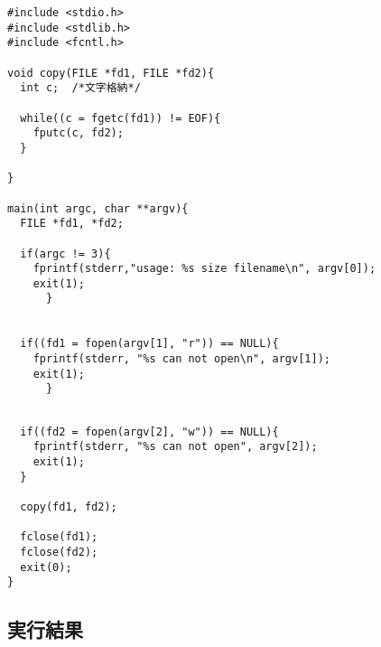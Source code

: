 \documentclass[12pt, a4paper, titlepage]{jsarticle}
\begin{document}
\begin{screen}
\begin{verbatim}
#include <stdio.h>
#include <stdlib.h>
#include <fcntl.h>

void copy(FILE *fd1, FILE *fd2){
  int c;  /*文字格納*/

  while((c = fgetc(fd1)) != EOF){
    fputc(c, fd2);
  }

}

main(int argc, char **argv){
  FILE *fd1, *fd2;

  if(argc != 3){
    fprintf(stderr,"usage: %s size filename\n", argv[0]);
    exit(1);
      }


  if((fd1 = fopen(argv[1], "r")) == NULL){
    fprintf(stderr, "%s can not open\n", argv[1]);
    exit(1);
      }
       \end{verbatim}
\end{screen}
\begin{screen}
\begin{verbatim}

  if((fd2 = fopen(argv[2], "w")) == NULL){
    fprintf(stderr, "%s can not open", argv[2]);
    exit(1);
  }

  copy(fd1, fd2);

  fclose(fd1);
  fclose(fd2);
  exit(0);
}
\end{verbatim}
\end{screen}
\subsection{実行結果}
\end{document}
